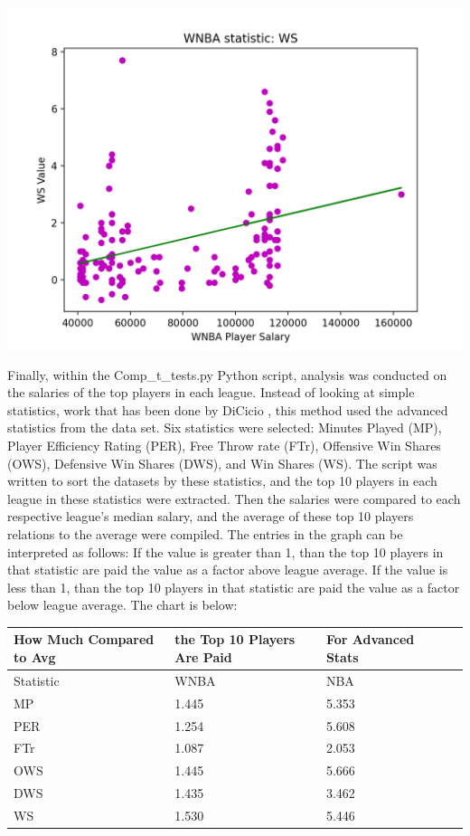 \documentclass[12pt]{article}
\begin{document}
\newline
\includegraphics[width=.85\textwidth]{WNBA_WS_Graph.png}

\par
Finally, within the Comp\_t\_tests.py Python script, analysis was conducted on the salaries of the top players in each league. Instead of looking at 
simple statistics, work that has been done by DiCicio \citep{Hoop_Dreams}, this method used the advanced statistics from the data set. Six statistics were selected: Minutes 
Played (MP), Player Efficiency Rating (PER), Free Throw rate (FTr), Offensive Win Shares (OWS), Defensive Win Shares (DWS), and Win Shares (WS). The 
script was written to sort the datasets by these statistics, and the top 10 players in each league in these statistics were extracted. Then the salaries 
were compared to each respective league's median salary, and the average of these top 10 players relations to the average were compiled. The entries in 
the graph can be interpreted as follows: If the value is greater than 1, than the top 10 players in that statistic are paid the value as a factor above 
league average. If the value is less than 1, than the top 10 players in that statistic are paid the value as a factor below league average. The chart is 
below:
\vspace*{1cm}
\begin{tabular}{*5l} 
\toprule
How Much Compared to Avg & the Top 10 Players Are Paid & For Advanced Stats \\\midrule

Statistic &  WNBA  & NBA \\ 

 MP  &  1.445  & 5.353 \\
 PER   &  1.254   & 5.608        \\       
 FTr   &  1.087   & 2.053       \\         
 OWS   & 1.445    & 5.666        \\
 DWS  & 1.435    & 3.462       \\
 WS   &  1.530  & 5.446                 \\
 \hline
\end{tabular}
\end{document}
